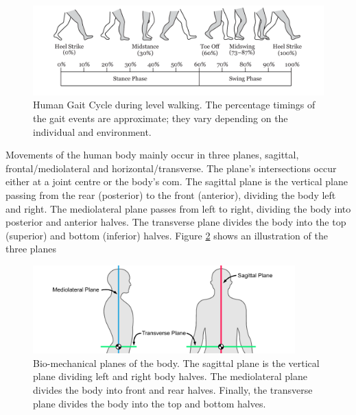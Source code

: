\begin{figure}[!hbt]
    \centering
    \includegraphics[width=\textwidth]{content/4-LSTM_Behaviour/Gait_Cycle.pdf}
    \caption[Human Gait Cycle during level walking]{Human Gait Cycle during level walking. The percentage timings of the gait events are approximate; they vary depending on the individual and environment.\cite{Sherratt2021}}
    \label{fig:background_gait_cycle}
\end{figure}

Movements of the human body mainly occur in three planes, sagittal, frontal/mediolateral and horizontal/transverse. The plane's intersections occur either at a joint centre or the body's \acrfull{com}. The sagittal plane is the vertical plane passing from the rear (posterior) to the front (anterior), dividing the body left and right. The mediolateral plane passes from left to right, dividing the body into posterior and anterior halves. The transverse plane divides the body into the top (superior) and bottom (inferior) halves.\cite{Bartlett2007} Figure \ref{fig:background_planes_of_the_body} shows an illustration of the three planes

\begin{figure}[!hbt]
    \centering
    \includegraphics[width=0.9\textwidth]{content/2-Background/body_planes.pdf}
    \caption[Bio-mechanical planes of the body]{Bio-mechanical planes of the body. The sagittal plane is the vertical plane dividing left and right body halves. The mediolateral plane divides the body into front and rear halves. Finally, the transverse plane divides the body into the top and bottom halves.}
    \label{fig:background_planes_of_the_body}
\end{figure}

